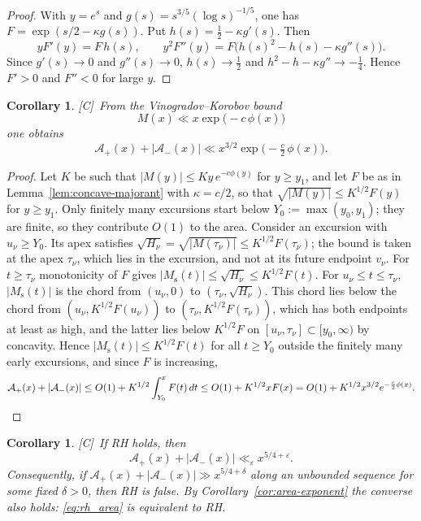 \documentclass[11pt]{amsart}
\numberwithin{equation}{section}
\theoremstyle{plain}
\newtheorem{corollary}[theorem]{Corollary}
\theoremstyle{definition}
\theoremstyle{remark}
\newcommand{\Ms}{M_{\mathrm{s}}}
\newcommand{\Ap}{\mathcal{A}_{+}}
\newcommand{\Am}{\mathcal{A}_{-}}
\newcommand{\eps}{\varepsilon}
\newcommand{\tagC}{\textup{[C]}}
\begin{document}
\begin{proof}
With $y=e^s$ and $g(s)=s^{3/5}(\log s)^{-1/5}$, one has
$F=\exp(s/2-\kappa g(s))$. Put $h(s)=\frac12-\kappa g'(s)$. Then
\[
yF'(y)=F\,h(s),\qquad
y^2F''(y)=F\bigl(h(s)^2-h(s)-\kappa g''(s)\bigr).
\]
Since $g'(s)\to0$ and $g''(s)\to0$, $h(s)\to\frac12$ and
$h^2-h-\kappa g''\to-\frac14$. Hence $F'>0$ and $F''<0$ for large $y$.
\end{proof}

\begin{corollary}
\label{cor:uncond}
\tagC\ From the Vinogradov--Korobov bound \cite{Walfisz1963}
\begin{equation}
\label{eq:VK_M}
  M(x)\ll x\exp\bigl(-c\,\phi(x)\bigr)
\end{equation}
one obtains
\begin{equation}
\label{eq:uncond_area}
  \Ap(x)+|\Am(x)|\ll x^{3/2}\exp\bigl(-\tfrac c2\,\phi(x)\bigr).
\end{equation}
\end{corollary}

\begin{proof}
Let $K$ be such that $|M(y)|\le Ky\,e^{-c\phi(y)}$ for $y\ge y_1$, and let
$F$ be as in Lemma~\ref{lem:concave-majorant} with $\kappa=c/2$, so that
$\sqrt{|M(y)|}\le K^{1/2}F(y)$ for $y\ge y_1$. Only finitely many excursions
start below $Y_0:=\max(y_0,y_1)$; they are finite, so they contribute
$O(1)$ to the area. Consider an excursion with $u_\nu\ge Y_0$. Its apex
satisfies $\sqrt{H_\nu}=\sqrt{|M(\tau_\nu)|}\le K^{1/2}F(\tau_\nu)$; the
bound is taken at the apex $\tau_\nu$, which lies in the excursion, and not
at its future endpoint $v_\nu$. For $t\ge\tau_\nu$ monotonicity of $F$ gives
$|\Ms(t)|\le\sqrt{H_\nu}\le K^{1/2}F(t)$. For $u_\nu\le t\le\tau_\nu$,
$|\Ms(t)|$ is the chord from $(u_\nu,0)$ to $(\tau_\nu,\sqrt{H_\nu})$. This
chord lies below the chord from $(u_\nu,K^{1/2}F(u_\nu))$ to
$(\tau_\nu,K^{1/2}F(\tau_\nu))$, which has both endpoints at least as high,
and the latter lies below $K^{1/2}F$ on $[u_\nu,\tau_\nu]\subset[y_0,\infty)$
by concavity. Hence $|\Ms(t)|\le K^{1/2}F(t)$ for all $t\ge Y_0$ outside the
finitely many early excursions, and since $F$ is increasing,
\[
\Ap(x)+|\Am(x)|\le O(1)+K^{1/2}\int_{Y_0}^xF(t)\,dt
\le O(1)+K^{1/2}xF(x)=O(1)+K^{1/2}x^{3/2}e^{-\frac c2\phi(x)}.
\qedhere
\]
\end{proof}

\begin{corollary}
\label{cor:rh}
\tagC\ If RH holds, then
\begin{equation}
\label{eq:rh_area}
  \Ap(x)+|\Am(x)|\ll_\eps x^{5/4+\eps}.
\end{equation}
Consequently, if $\Ap(x)+|\Am(x)|\gg x^{5/4+\delta}$ along an unbounded
sequence for some fixed $\delta>0$, then RH is false. By
Corollary~\ref{cor:area-exponent} the converse also holds: \eqref{eq:rh_area}
is equivalent to RH.
\end{corollary}
\end{document}
